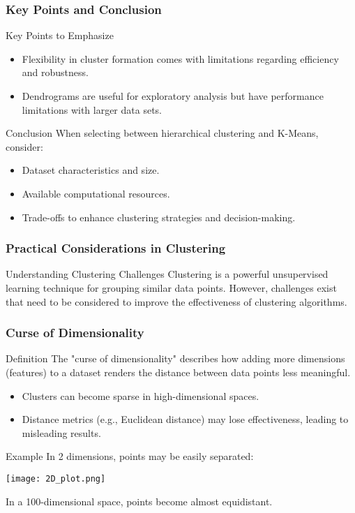 \documentclass[aspectratio=169]{beamer}
\begin{document}
\begin{frame}[fragile]
    \frametitle{Key Points and Conclusion}
    
    \begin{block}{Key Points to Emphasize}
        \begin{itemize}
            \item Flexibility in cluster formation comes with limitations regarding efficiency and robustness.
            \item Dendrograms are useful for exploratory analysis but have performance limitations with larger data sets.
        \end{itemize}
    \end{block}
    
    \begin{block}{Conclusion}
        When selecting between hierarchical clustering and K-Means, consider:
        \begin{itemize}
            \item Dataset characteristics and size.
            \item Available computational resources.
            \item Trade-offs to enhance clustering strategies and decision-making.
        \end{itemize}
    \end{block}
\end{frame}

\begin{frame}[fragile]
    \frametitle{Practical Considerations in Clustering}
    \begin{block}{Understanding Clustering Challenges}
        Clustering is a powerful unsupervised learning technique for grouping similar data points. However, challenges exist that need to be considered to improve the effectiveness of clustering algorithms.
    \end{block}
\end{frame}

\begin{frame}[fragile]
    \frametitle{Curse of Dimensionality}
    \begin{block}{Definition}
        The "curse of dimensionality" describes how adding more dimensions (features) to a dataset renders the distance between data points less meaningful.
    \end{block}
    \begin{itemize}
        \item Clusters can become sparse in high-dimensional spaces.
        \item Distance metrics (e.g., Euclidean distance) may lose effectiveness, leading to misleading results.
    \end{itemize}
    \begin{block}{Example}
        In 2 dimensions, points may be easily separated:
        \begin{center}
            \texttt{[image: 2D\_plot.png]} %
        \end{center}
        In a 100-dimensional space, points become almost equidistant.
    \end{block}
\end{frame}
\end{document}
